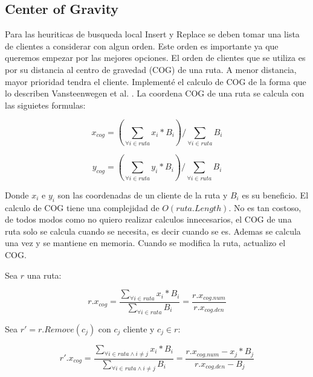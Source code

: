 \subsection{Center of Gravity}

Para las heuriticas de busqueda local Insert y Replace se deben tomar una lista de clientes a considerar con algun orden. Este orden es importante ya que queremos empezar por las mejores opciones. El orden de clientes que se utiliza es por su distancia al centro de gravedad (COG) de una ruta. A menor distancia, mayor prioridad tendra el cliente. Implementé el calculo de COG de la forma que lo describen Vansteenwegen et al. \cite{VansteenwegenSouffriauBergheOudheusden}. La coordena COG de una ruta se calcula con las siguietes formulas:

\begin{equation}
x_{cog} = (\sum_{\forall i \in ruta} x_i * B_i) / \sum_{\forall i \in ruta} B_i
\end{equation}

\begin{equation}
y_{cog} = (\sum_{\forall i \in ruta} y_i * B_i) / \sum_{\forall i \in ruta} B_i
\end{equation}

\bigskip

Donde $x_i$ e $y_i$ son las coordenadas de un cliente de la ruta y $B_i$ es su beneficio.
El calculo de COG tiene una complejidad de $O(ruta.Length)$. No es tan costoso, de todos modos como no quiero realizar calculos innecesarios, el COG de una ruta solo se calcula cuando se necesita, es decir cuando se es. Ademas se calcula una vez y se mantiene en memoria. Cuando se modifica la ruta, actualizo el COG.

\bigskip

Sea $r$ una ruta:

\begin{equation}
r.x_{cog} =  \frac{\sum_{\forall i \in ruta} x_i * B_i}{\sum_{\forall i \in ruta} B_i}  = \frac{r.x_{cog.num}}{r.x_{cog.den}}
\end{equation}

\bigskip

Sea $r' = r.Remove(c_j)$ con $c_j$ cliente y $c_j \in r$:

\begin{equation}
r'.x_{cog} =  \frac{\sum_{\forall i \in ruta \wedge i \neq j} x_i * B_i}{\sum_{\forall i \in ruta \wedge i \neq j} B_i}  = \frac{r.x_{cog.num}-x_j*B_j}{r.x_{cog.den}-B_j}
\end{equation}

